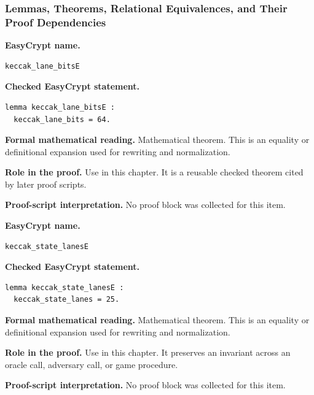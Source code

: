 \subsubsection*{Lemmas, Theorems, Relational Equivalences, and Their Proof Dependencies}
\begin{formaltheorem}
\noindent\textbf{EasyCrypt name.}
\begin{lstlisting}[language=EasyCrypt,basicstyle=\ttfamily\scriptsize]
keccak_lane_bitsE
\end{lstlisting}
\noindent\textbf{Checked EasyCrypt statement.}
\begin{lstlisting}[language=EasyCrypt,basicstyle=\ttfamily\scriptsize]
lemma keccak_lane_bitsE :
  keccak_lane_bits = 64.
\end{lstlisting}
\noindent\textbf{Formal mathematical reading.}
Mathematical theorem. This is an equality or definitional expansion used for rewriting and normalization.

\noindent\textbf{Role in the proof.}
Use in this chapter. It is a reusable checked theorem cited by later proof scripts.

\noindent\textbf{Proof-script interpretation.}
No proof block was collected for this item.

\end{formaltheorem}

\begin{formaltheorem}
\noindent\textbf{EasyCrypt name.}
\begin{lstlisting}[language=EasyCrypt,basicstyle=\ttfamily\scriptsize]
keccak_state_lanesE
\end{lstlisting}
\noindent\textbf{Checked EasyCrypt statement.}
\begin{lstlisting}[language=EasyCrypt,basicstyle=\ttfamily\scriptsize]
lemma keccak_state_lanesE :
  keccak_state_lanes = 25.
\end{lstlisting}
\noindent\textbf{Formal mathematical reading.}
Mathematical theorem. This is an equality or definitional expansion used for rewriting and normalization.

\noindent\textbf{Role in the proof.}
Use in this chapter. It preserves an invariant across an oracle call, adversary call, or game procedure.

\noindent\textbf{Proof-script interpretation.}
No proof block was collected for this item.

\end{formaltheorem}

